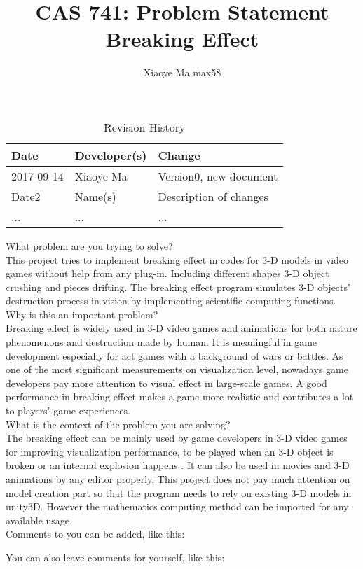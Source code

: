 \documentclass{article}
\title{CAS 741: Problem Statement\\Breaking Effect}
\author{Xiaoye Ma max58}
\date{}
\begin{document}
\maketitle

\begin{table}[hp]
\caption{Revision History} \label{TblRevisionHistory}
\begin{tabularx}{\textwidth}{llX}
\toprule
\textbf{Date} & \textbf{Developer(s)} & \textbf{Change}\\
\midrule
2017-09-14 & Xiaoye Ma & Version0, new document\\
Date2 & Name(s) & Description of changes\\
... & ... & ...\\
\bottomrule
\end{tabularx}
\end{table}

What problem are you trying to solve?\\

This project tries to implement breaking effect in codes for 3-D models in video games without help from any plug-in. Including different shapes 3-D object crushing and pieces drifting. The breaking effect program simulates 3-D objects’ destruction process in vision by implementing scientific computing functions.\\      

Why is this an important problem?\\

Breaking effect is widely used in 3-D video games and animations for both nature phenomenons and destruction made by human. It is meaningful in game development especially for act games with a background of wars or battles. As one of the most significant measurements on visualization level, nowadays game developers pay more attention to visual effect in large-scale games. A good performance in breaking effect makes a game more realistic and contributes a lot to players’ game experiences.\\ 

What is the context of the problem you are solving?\\

The breaking effect can be mainly used by game developers in 3-D video games for improving visualization performance, to be played when an 3-D object is broken or an internal explosion happens . It can also be used in movies and 3-D animations by any editor properly. This project does not pay much attention on model creation part so that the program needs to rely on existing 3-D models in unity3D. However the mathematics computing method can be imported for any available usage. \\

Comments to you can be added, like this:


You can also leave comments for yourself, like this:

\end{document}
